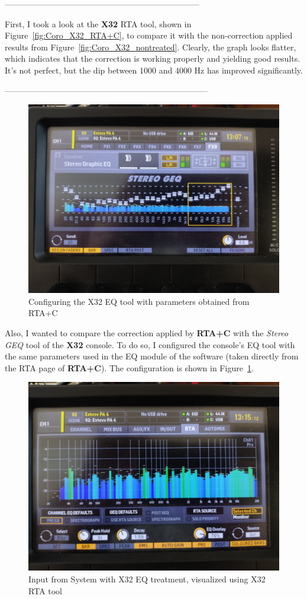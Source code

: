 -----------------------------------------------------------------------

First, I took a look at the \textbf{X32} RTA tool, shown in Figure~\ref{fig:Coro_X32_RTA+C}, to compare it with the non-correction applied results from Figure~\ref{fig:Coro_X32_nontreated}. Clearly, the graph looks flatter, which indicates that the correction is working properly and yielding good results. It’s not perfect, but the dip between 1000 and 4000 Hz has improved significantly.

--------------------------------------------------------------------------

\begin{figure}[H]
	\centering
	\includegraphics[width=0.8
	\linewidth]{Figures/Coro_X32_EQ.jpeg}
	\caption{Configuring the X32 EQ tool with parameters obtained from RTA+C}
	\label{fig:Coro_X32_EQ}
\end{figure}

Also, I wanted to compare the correction applied by \textbf{RTA+C} with the \textit{Stereo GEQ} tool of the \textbf{X32} console. To do so, I configured the console's EQ tool with the same parameters used in the EQ module of the software (taken directly from the RTA page of \textbf{RTA+C}). The configuration is shown in Figure~\ref{fig:Coro_X32_EQ}.

\begin{figure}[H]
	\centering
	\includegraphics[width=0.8
	\linewidth]{Figures/Coro_X32_treatedX32.jpeg}
	\caption{Input from System with X32 EQ treatment, visualized using X32 RTA tool}
	\label{fig:Coro_X32_treatedX32}
\end{figure}

